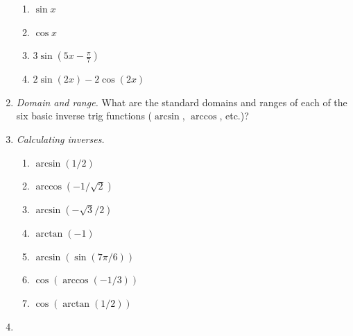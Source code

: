 \begin{enumerate}
\begin{enumerate}
\item $\sin x$
\item $\cos x$
\item $3\sin(5x - \tfrac{\pi}{7})$
\item $2\sin(2x) - 2\cos(2x)$
\end{enumerate}
\item \emph{Domain and range.} What are the standard domains and ranges of each of the six basic inverse trig functions ($\arcsin$, $\arccos$, etc.)?\newpage
\item \emph{Calculating inverses.}
\begin{enumerate}
\item $\arcsin(1/2)$
\item $\arccos\left(-1/\sqrt{2}\right)$
\item $\arcsin\left(-\sqrt{3}/2\right)$
\item $\arctan(-1)$
\item $\arcsin(\sin(7\pi/6))$
\item $\cos(\arccos(-1/3))$
\item $\cos(\arctan(1/2))$
\end{enumerate}
\item 
\end{enumerate}